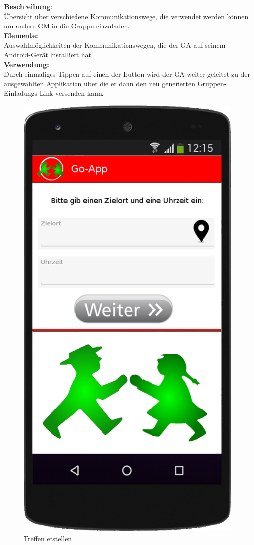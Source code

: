 \textbf{Beschreibung:}\\
Übersicht über verschiedene Kommunikationswege, die verwendet werden können um andere GM in die Gruppe einzuladen.\\
\textbf{Elemente:}\\
Auswahlmöglichkeiten der Kommunikationswegen, die der GA auf seinem Android-Gerät installiert hat\\
\textbf{Verwendung:}\\
Durch einmaliges Tippen auf einen der Button wird der GA weiter geleitet zu der ausgewählten Applikation über die er dann den neu generierten Gruppen-Einladungs-Link versenden kann.
\newpage

\begin{figure}
	\caption{Treffen erstellen}
	\includegraphics[scale =0.2]{resources/images/handy/treffpunkt_erstellen.png}

\end{figure}
